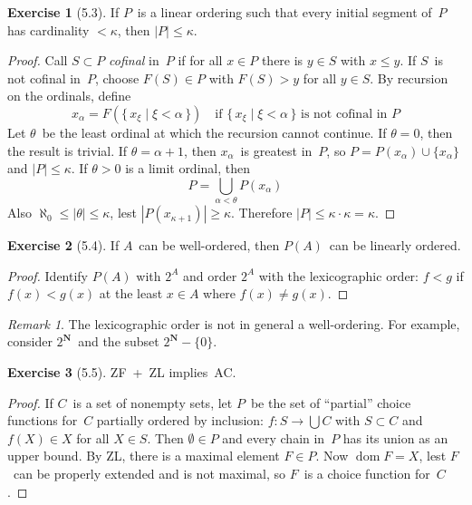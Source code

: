 \documentclass[letterpaper,12pt]{article}
\newcommand{\N}{\boldsymbol{N}}
\newcommand{\al}{\aleph}
\newcommand{\union}{\cup}
\newcommand{\bigunion}{\bigcup}
\newcommand{\mult}{\cdot}
\DeclareMathOperator{\dom}{dom}
\newcommand{\card}[1]{|#1|}
\theoremstyle{definition}
\newtheorem*{exer}{Exercise}
\theoremstyle{remark}
\newtheorem*{rmk}{Remark}
\begin{document}
\begin{exer}[5.3]
If \(P\)~is a linear ordering such that every initial segment of~\(P\) has cardinality \(<\kappa\), then \(\card{P}\le\kappa\).
\end{exer}
\begin{proof}
Call \(S\subset P\) \emph{cofinal} in~\(P\) if for all \(x\in P\) there is \(y\in S\) with \(x\le y\). If \(S\)~is not cofinal in~\(P\), choose \(F(S)\in P\) with \(F(S)>y\) for all \(y\in S\). By recursion on the ordinals, define
\[x_{\alpha}=F(\{\,x_{\xi}\mid\xi<\alpha\,\})\quad\text{if }\{\,x_{\xi}\mid\xi<\alpha\,\}\text{ is not cofinal in~\(P\)}\]
Let \(\theta\)~be the least ordinal at which the recursion cannot continue. If \(\theta=0\), then the result is trivial. If \(\theta=\alpha+1\), then \(x_{\alpha}\)~is greatest in~\(P\), so \(P=P(x_{\alpha})\union\{x_{\alpha}\}\) and \(\card{P}\le\kappa\). If \(\theta>0\) is a limit ordinal, then
\[P=\bigunion_{\alpha<\theta}P(x_{\alpha})\]
Also \(\al_0\le\card{\theta}\le\kappa\), lest \(\card{P(x_{\kappa+1})}\ge\kappa\). Therefore \(\card{P}\le\kappa\mult\kappa=\kappa\).
\end{proof}

\begin{exer}[5.4]
If \(A\)~can be well-ordered, then \(P(A)\)~can be linearly ordered.
\end{exer}
\begin{proof}
Identify \(P(A)\) with \(2^A\) and order \(2^A\) with the lexicographic order: \(f<g\) if \(f(x)<g(x)\) at the least \(x\in A\) where \(f(x)\ne g(x)\).
\end{proof}
\begin{rmk}
The lexicographic order is not in general a well-ordering. For example, consider \(2^{\N}\)~and the subset \(2^{\N}-\{0\}\).
\end{rmk}

\begin{exer}[5.5]
ZF~+~ZL implies~AC.
\end{exer}
\begin{proof}
If \(C\)~is a set of nonempty sets, let \(P\)~be the set of ``partial'' choice functions for~\(C\) partially ordered by inclusion: \(f:S\to\bigunion C\) with \(S\subset C\) and \(f(X)\in X\) for all \(X\in S\). Then \(\emptyset\in P\) and every chain in~\(P\) has its union as an upper bound. By ZL, there is a maximal element \(F\in P\). Now \(\dom F=X\), lest \(F\)~can be properly extended and is not maximal, so \(F\)~is a choice function for~\(C\).
\end{proof}
\end{document}
